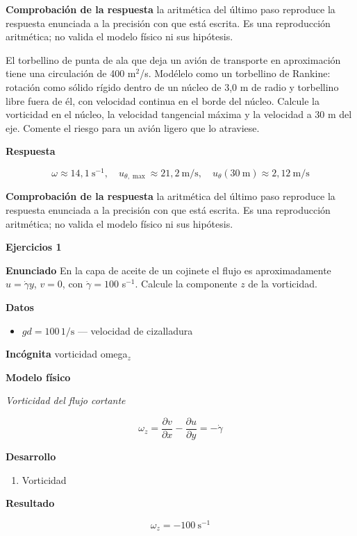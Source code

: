 \documentclass[10pt,openany]{book}
\begin{document}
\noindent\textbf{Comprobación de la respuesta} la aritmética del último paso reproduce la respuesta enunciada a la precisión con que está escrita. Es una reproducción aritmética; no valida el modelo físico ni sus hipótesis.

El torbellino de punta de ala que deja un avión de transporte en aproximación tiene una circulación de 400 m\(^2\)/s. Modélelo como un torbellino de Rankine: rotación como sólido rígido dentro de un núcleo de 3,0 m de radio y torbellino libre fuera de él, con velocidad continua en el borde del núcleo. Calcule la vorticidad en el núcleo, la velocidad tangencial máxima y la velocidad a 30 m del eje. Comente el riesgo para un avión ligero que lo atraviese.

\noindent\textbf{Respuesta}

\[
\omega \approx 14{,}1\ \mathrm{s^{-1}},\quad u_{\theta,\max} \approx 21{,}2\ \mathrm{m/s},\quad u_\theta(30\ \mathrm{m}) \approx 2{,}12\ \mathrm{m/s}
\]

\noindent\textbf{Comprobación de la respuesta} la aritmética del último paso reproduce la respuesta enunciada a la precisión con que está escrita. Es una reproducción aritmética; no valida el modelo físico ni sus hipótesis.

\noindent\textbf{Ejercicios 1}

\noindent\textbf{Enunciado}
En la capa de aceite de un cojinete el flujo es aproximadamente \(u = \dot\gamma y\), \(v = 0\), con \(\dot\gamma = 100\) s\(^{-1}\). Calcule la componente \(z\) de la vorticidad.

\noindent\textbf{Datos}
\begin{itemize}
\item $gd = 100\,\mathrm{1/s}$ — velocidad de cizalladura
\end{itemize}

\noindent\textbf{Incógnita}
vorticidad omega\(_z\)

\noindent\textbf{Modelo físico}

\noindent\textit{Vorticidad del flujo cortante}

\[
\omega_z = \frac{\partial v}{\partial x} - \frac{\partial u}{\partial y} = -\dot\gamma
\]

\noindent\textbf{Desarrollo}
\begin{enumerate}
\item
Vorticidad
\end{enumerate}

\noindent\textbf{Resultado}

\[
\omega_z = -100\ \mathrm{s^{-1}}
\]
\end{document}

